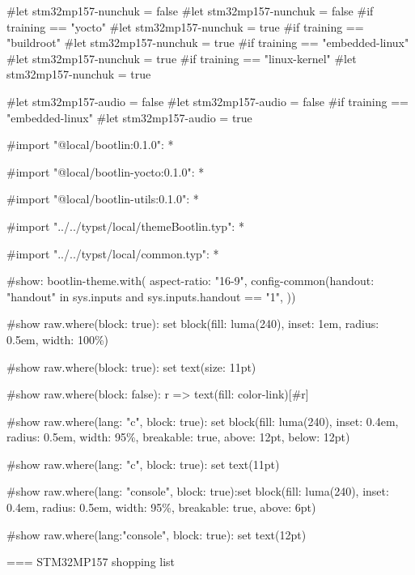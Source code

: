 #let stm32mp157-nunchuk = false
#let stm32mp157-nunchuk = false
#if training == "yocto" {#let stm32mp157-nunchuk = true}
#if training == "buildroot" {#let stm32mp157-nunchuk = true}
#if training == "embedded-linux" {#let stm32mp157-nunchuk = true}
#if training == "linux-kernel" {#let stm32mp157-nunchuk = true}

#let stm32mp157-audio = false
#let stm32mp157-audio = false
#if training == "embedded-linux" {#let stm32mp157-audio = true}

#import "@local/bootlin:0.1.0": *

#import "@local/bootlin-yocto:0.1.0": *

#import "@local/bootlin-utils:0.1.0": *

#import "../../typst/local/themeBootlin.typ": *

#import "../../typst/local/common.typ": *

#show: bootlin-theme.with( aspect-ratio: "16-9", config-common(handout: "handout" in sys.inputs and sys.inputs.handout == "1", ))

#show raw.where(block: true): set block(fill: luma(240), inset: 1em, radius: 0.5em, width: 100\%)

#show raw.where(block: true): set text(size: 11pt)

#show raw.where(block: false): r => text(fill: color-link)[#r]

#show raw.where(lang: "c", block: true): set block(fill: luma(240), inset: 0.4em, radius: 0.5em, width: 95\%, breakable: true, above: 12pt, below: 12pt)

#show raw.where(lang: "c", block: true): set text(11pt)

#show raw.where(lang: "console", block: true):set block(fill: luma(240), inset: 0.4em, radius: 0.5em, width: 95\%, breakable: true, above: 6pt)

#show raw.where(lang:"console", block: true): set text(12pt)

=== STM32MP157 shopping list
  \footnotesize
  
